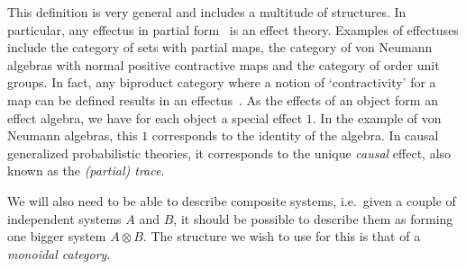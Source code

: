 \documentclass[a4paper,onecolumn,10pt,accepted=2019-05-03, issue=1, volume=1, shorttitle=papers/compositionality-1-1]{compositionalityarticle}
\newcounter{counter}
\numberwithin{counter}{section}
\newtheorem{definition}[counter]{Definition}
\newtheorem{remark}[counter]{Remark}
\begin{document}
This definition is very general and includes a multitude of structures. In particular, any effectus in partial form~\cite{cho2015introduction} is an effect theory. Examples of effectuses include the category of sets with partial maps, the category of von Neumann algebras with normal positive contractive maps and the category of order unit groups. In fact, any biproduct category where a notion of `contractivity' for a map can be defined results in an effectus~\cite{cho2015introduction}. 
As the effects of an object form an effect algebra, we have for each object a special effect $1$. In the example of von Neumann algebras, this $1$ corresponds to the identity of the algebra. In causal generalized probabilistic theories, it corresponds to the unique \emph{causal} effect, also known as the \emph{(partial) trace}.


We will also need to be able to describe composite systems, i.e.\ given a couple of independent systems $A$ and $B$, it should be possible to describe them as forming one bigger system $A\otimes B$. The structure we wish to use for this is that of a \emph{monoidal category}.

\end{document}
